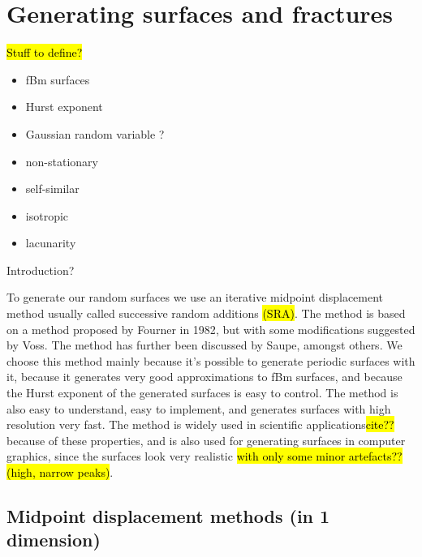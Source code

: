 \chapter{Generating surfaces and fractures}
\hl{Stuff to define?}
\begin{itemize}
    \item fBm surfaces
    \item Hurst exponent
    \item Gaussian random variable ?
    \item non-stationary
    \item self-similar
    \item isotropic
    \item lacunarity
\end{itemize}

Introduction?

To generate our random surfaces we use an iterative midpoint displacement method usually called successive random additions \hl{(SRA)}. The method is based on a method proposed by Fourner in 1982\cite{fournier1982computer}, but with some modifications suggested by Voss\cite{voss1985random, voss1988fractals}. The method has further been discussed by Saupe\cite{saupe1988algorithms}, amongst others. We choose this method mainly because it's possible to generate periodic surfaces with it, because it generates very good approximations to fBm surfaces\cite{zhou2005comparison}, and because the Hurst exponent of the generated surfaces is easy to control. The method is also easy to understand, easy to implement, and generates surfaces with high resolution very fast. The method is widely used in scientific applications\hl{cite??} because of these properties, and is also used for generating surfaces in computer graphics, since the surfaces look very realistic \hl{with only some minor artefacts?? (high, narrow peaks)}.

\section{Midpoint displacement methods (in 1 dimension)}

